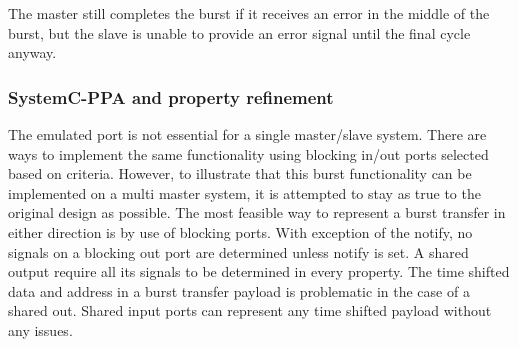 The master still completes the burst if it receives an error in the middle of the burst, but the slave is unable to provide an error signal until the final cycle anyway. 


\subsubsection{SystemC-PPA and property refinement}
The emulated port is not essential for a single master/slave system. There are ways to implement the same functionality using blocking in/out ports selected
based on criteria. However, to illustrate that this burst functionality can be implemented on a multi master system, it is attempted to stay as true to the
original design as possible. The most feasible way to represent a burst transfer in either direction is by use of blocking ports. With exception of the notify, no signals on a blocking out port are determined unless notify is set. A shared output require all its signals to be determined in every property. The time shifted data and address in a burst transfer payload is problematic in the case of a shared out. Shared input ports can represent any time shifted payload without any issues.

